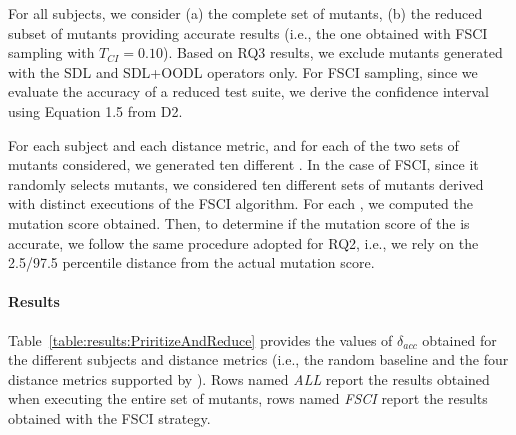 For all subjects, we consider (a) the complete set of mutants, (b) the reduced subset of mutants providing accurate results (i.e., the one obtained with FSCI sampling with $T_{\mathit{CI}}=0.10$). 
Based on RQ3 results, we exclude mutants generated with the SDL and SDL+OODL operators only. 
For FSCI sampling, since we evaluate the accuracy of a reduced test suite, we derive the confidence interval using Equation 1.5 from D2. 


For each subject and each distance metric, and for each of the two sets of mutants considered, we generated ten different \MPTSs. In the case of FSCI, since it randomly selects mutants, we considered ten different sets of mutants derived with distinct executions of the FSCI algorithm. For each \MPTS, we computed the mutation score obtained. 
Then, to determine if the mutation score of the \MPTS is accurate, we follow the same procedure adopted for RQ2, i.e., we rely on the 2.5/97.5 percentile distance from the actual mutation score. 



\paragraph{Results}




Table~\ref{table:results:PriritizeAndReduce} provides the values of $\delta_{acc}$ obtained for the different subjects and distance metrics (i.e., the random baseline and the four distance metrics supported by \APPR). Rows named \emph{ALL} report the results obtained when executing the entire set of mutants, rows named \emph{FSCI}  report the results obtained  with the FSCI strategy. 



